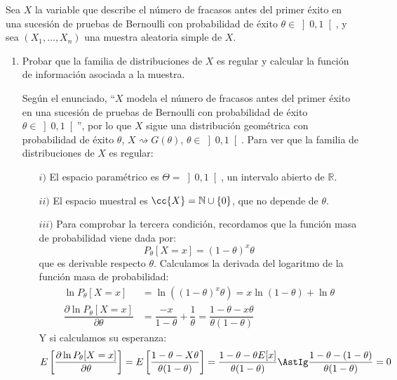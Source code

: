 \begin{ejercicio}
    Sea $X$ la variable que describe el número de fracasos antes del primer éxito en una sucesión de pruebas de Bernoulli con probabilidad de éxito $\theta\in \left]0,1\right[$, y sea $(X_1, \ldots, X_n)$ una muestra aleatoria simple de $X$.
    \begin{enumerate}[label=\alph*)]
        \item Probar que la familia de distribuciones de $X$ es regular y calcular la función de información asociada a la muestra.

            Según el enunciado, ``$X$ modela el número de fracasos antes del primer éxito en una sucesión de pruebas de Bernoulli con probabilidad de éxito $\theta\in \left]0,1\right[$'', por lo que $X$ sigue una distribución geométrica con probabilidad de éxito $\theta$, $X\rightsquigarrow G(\theta)$, $\theta \in \left]0,1\right[$. Para ver que la familia de distribuciones de $X$ es regular:
            \begin{enumerate}
                \item[$i)$] El espacio paramétrico es $\Theta = \left]0,1\right[$, un intervalo abierto de $\mathbb{R}$.
                \item[$ii)$] El espacio muestral es $\cc{X}=\mathbb{N}\cup \{0\}$, que no depende de $\theta$.
                \item[$iii)$] Para comprobar la tercera condición, recordamos que la función masa de probabilidad viene dada por:
                    \begin{equation*}
                        P_\theta[X=x] = {(1-\theta)}^{x}\theta
                    \end{equation*}
                    que es derivable respecto $\theta$. Calculamos la derivada del logaritmo de la función masa de probabilidad:
                    \begin{align*}
                        \ln P_\theta[X=x] &= \ln\left({(1-\theta)}^{x}\theta\right) = x\ln(1-\theta) + \ln\theta \\
                        \dfrac{\partial \ln P_\theta[X=x]}{\partial \theta} &= \dfrac{-x}{1-\theta} + \dfrac{1}{\theta} = \dfrac{1-\theta - x\theta}{\theta(1-\theta)} 
                    \end{align*}
                    Y si calculamos su esperanza:
                    \begin{equation*} %
                        E\left[\dfrac{\partial \ln P_\theta[X=x]}{\partial \theta}\right] = E\left[\dfrac{1-\theta - X\theta}{\theta(1-\theta)} \right] = \dfrac{1-\theta - \theta E[x]}{\theta(1-\theta)} \AstIg \dfrac{1-\theta - (1-\theta)}{\theta(1-\theta)} = 0

\end{equation*}
\end{enumerate}
\end{enumerate}
\end{ejercicio}

